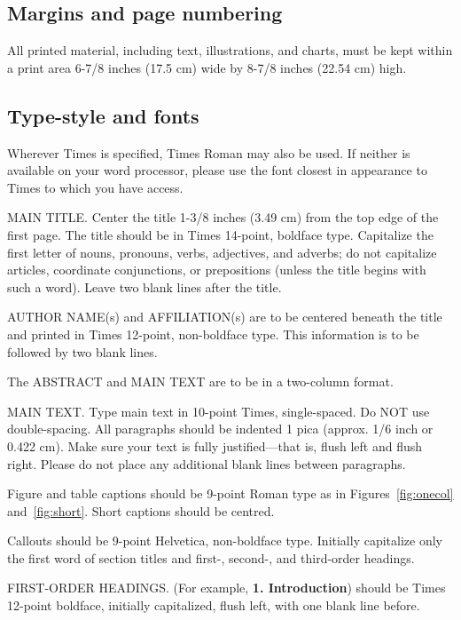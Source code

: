\documentclass[10pt,twocolumn,letterpaper]{article}
\begin{document}
\subsection{Margins and page numbering}

All printed material, including text, illustrations, and charts, must be
kept within a print area 6-7/8 inches (17.5 cm) wide by 8-7/8 inches
(22.54 cm) high.


\subsection{Type-style and fonts}

Wherever Times is specified, Times Roman may also be used. If neither is
available on your word processor, please use the font closest in
appearance to Times to which you have access.

MAIN TITLE. Center the title 1-3/8 inches (3.49 cm) from the top edge of
the first page. The title should be in Times 14-point, boldface type.
Capitalize the first letter of nouns, pronouns, verbs, adjectives, and
adverbs; do not capitalize articles, coordinate conjunctions, or
prepositions (unless the title begins with such a word). Leave two blank
lines after the title.

AUTHOR NAME(s) and AFFILIATION(s) are to be centered beneath the title
and printed in Times 12-point, non-boldface type. This information is to
be followed by two blank lines.

The ABSTRACT and MAIN TEXT are to be in a two-column format.

MAIN TEXT. Type main text in 10-point Times, single-spaced. Do NOT use
double-spacing. All paragraphs should be indented 1 pica (approx. 1/6
inch or 0.422 cm). Make sure your text is fully justified---that is,
flush left and flush right. Please do not place any additional blank
lines between paragraphs.

Figure and table captions should be 9-point Roman type as in
Figures~\ref{fig:onecol} and~\ref{fig:short}.  Short captions should be centred.

\noindent Callouts should be 9-point Helvetica, non-boldface type.
Initially capitalize only the first word of section titles and first-,
second-, and third-order headings.

FIRST-ORDER HEADINGS. (For example, {\large \bf 1. Introduction})
should be Times 12-point boldface, initially capitalized, flush left,
with one blank line before.
\end{document}
